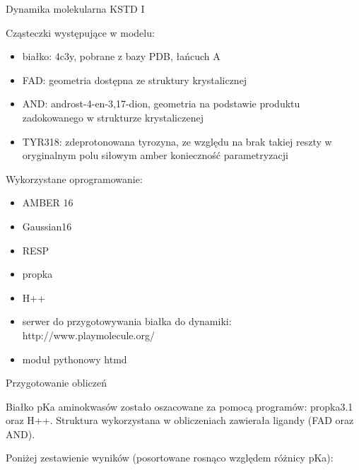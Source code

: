 \begin{section}{Dynamika molekularna KSTD I}

Cząsteczki występujące w modelu:
\begin{itemize}
 \item białko: 4c3y, pobrane z bazy PDB, łańcuch A
 \item FAD: geometria dostępna ze struktury krystalicznej
 \item AND: androst-4-en-3,17-dion, geometria na podstawie produktu zadokowanego w strukturze krystaliczenej
 \item TYR318: zdeprotonowana tyrozyna, ze względu na brak takiej reszty w oryginalnym polu siłowym amber konieczność parametryzacji
\end{itemize}

Wykorzystane oprogramowanie:
\begin{itemize}
 \item AMBER 16
 \item Gaussian16
 \item RESP
 \item propka
 \item H++
 \item serwer do przygotowywania białka do dynamiki: http://www.playmolecule.org/
 \item moduł pythonowy htmd
\end{itemize}


\begin{subsection}{Przygotowanie obliczeń}

\begin{subsubsection}{Białko}
 pKa aminokwasów zostało oszacowane za pomocą programów: propka3.1 oraz H++. Struktura wykorzystana w obliczeniach zawierała ligandy (FAD oraz AND). 
 
 Poniżej zestawienie wyników (posortowane rosnąco względem różnicy pKa):
 

\end{subsubsection}
\end{subsection}
\end{section}
